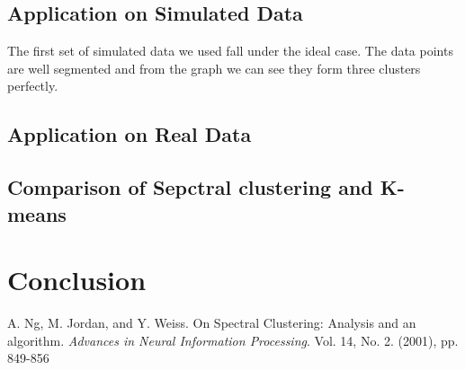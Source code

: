 \documentclass[11pt]{article}
\begin{document}
\subsection{Application on Simulated Data}
The first set of simulated data we used fall under the ideal case. The data points are well segmented and from the graph we can see they form three clusters perfectly.
\subsection{Application on Real Data}
\subsection{Comparison of Sepctral clustering and K-means}



\section{Conclusion}

%
%


\newpage
\begin{thebibliography}{9}



A. Ng, M. Jordan, and Y. Weiss.
On Spectral Clustering: Analysis and an algorithm.
\textit{Advances in Neural Information Processing}.
Vol. 14, No. 2. (2001), pp. 849-856 

\end{thebibliography}
\end{document}
